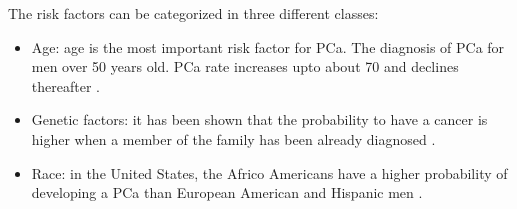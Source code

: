 The risk factors can be categorized in three different classes: 

\begin{itemize}
	\item Age: age is the most important risk factor for PCa. The diagnosis of PCa for men over 50 years old. PCa rate increases upto about 70 and declines thereafter \cite{AmericanCancerSociety2010}.
	\item Genetic factors: it has been shown that the probability to have a cancer is higher when a member of the family has been already diagnosed \cite{AmericanCancerSociety2010}.
	\item Race: in the United States, the Africo Americans have a higher probability of developing a PCa than European American and Hispanic men \cite{AmericanCancerSociety2010}.
\end{itemize}




